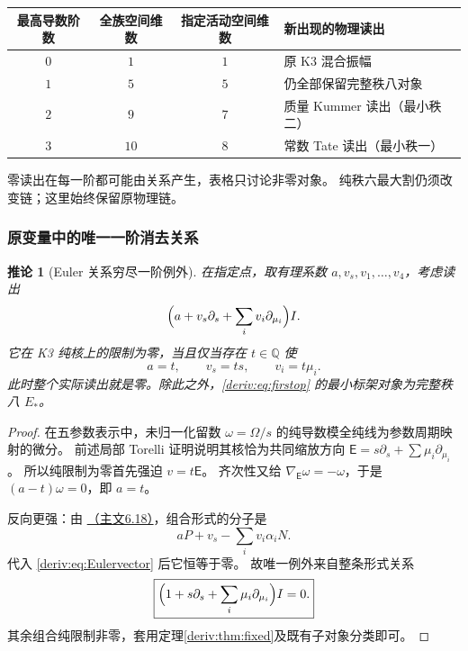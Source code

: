 \documentclass[11pt,a4paper,oneside]{ctexart}
\theoremstyle{cnplain}
\newtheorem{corollary}[theorem]{推论}
\theoremstyle{definition}
\theoremstyle{remark}
\newcommand{\Q}{\mathbb Q}
\numberwithin{equation}{section}
\newcommand{\otherref}[2]{\href{#1.pdf}{#2}}
\begin{document}
\begin{center}
\begin{tabular}{c|c|c|l}
\toprule
最高导数阶数&全族空间维数&指定活动空间维数&新出现的物理读出\\
\midrule
$0$&$1$&$1$&原 K3 混合振幅\\
$1$&$5$&$5$&仍全部保留完整秩八对象\\
$2$&$9$&$7$&质量 Kummer 读出（最小秩二）\\
$3$&$10$&$8$&常数 Tate 读出（最小秩一）\\
\bottomrule
\end{tabular}
\end{center}
零读出在每一阶都可能由关系产生，表格只讨论非零对象。
纯秩六最大割仍须改变链；这里始终保留原物理链。

\subsubsection{原变量中的唯一一阶消去关系}
\begin{corollary}[Euler 关系穷尽一阶例外]\label{deriv:cor:Euler}
在指定点，取有理系数 $a,v_s,v_1,\ldots,v_4$，考虑读出
\begin{equation}\label{deriv:eq:firstop}
 \Bigl(a+v_s\partial_s+\sum_iv_i\partial_{\mu_i}\Bigr)I.
\end{equation}
它在 K3 纯核上的限制为零，当且仅当存在 $t\in\Q$ 使
\begin{equation}\label{deriv:eq:Eulervector}
 a=t,\qquad v_s=ts,\qquad v_i=t\mu_i.
\end{equation}
此时整个实际读出就是零。除此之外，\eqref{deriv:eq:firstop} 的最小标架对象为完整秩八 $E_*$。
\end{corollary}
\begin{proof}
在五参数表示中，未归一化留数 $\omega=\Omega/s$ 的纯导数模全纯线为参数周期映射的微分。
前述局部 Torelli 证明说明其核恰为共同缩放方向
$\mathsf E=s\partial_s+\sum\mu_i\partial_{\mu_i}$。
所以纯限制为零首先强迫 $v=t\mathsf E$。
齐次性又给 $\nabla_{\mathsf E}\omega=-\omega$，于是 $(a-t)\omega=0$，即 $a=t$。

反向更强：由 \otherref{feynman_periods_long_paper}{（主文6.18）}，组合形式的分子是
\[
 aP+v_s-\sum_i v_i\alpha_iN.
\]
代入 \eqref{deriv:eq:Eulervector} 后它恒等于零。
故唯一例外来自整条形式关系
\begin{equation}\label{deriv:eq:Euler}
 \boxed{\Bigl(1+s\partial_s+\sum_i\mu_i\partial_{\mu_i}\Bigr)I=0.}
\end{equation}
其余组合纯限制非零，套用定理\ref{deriv:thm:fixed}及既有子对象分类即可。
\end{proof}
\end{document}
